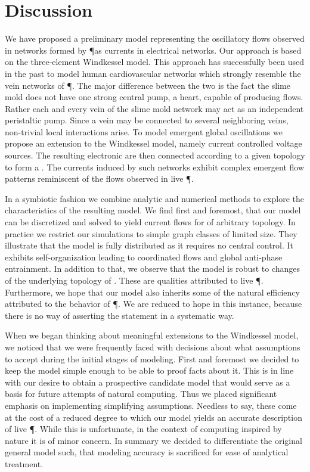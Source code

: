 \section{Discussion}

	We have proposed a preliminary model representing the oscillatory flows observed in networks formed by \P as currents in electrical networks. Our approach is based on the three-element Windkessel model. This approach has successfully been used in the past to model human cardiovascular networks which strongly resemble the vein networks of \P. The major difference between the two is the fact the slime mold does not have one strong central pump, \ie a heart, capable of producing flows. Rather each and every vein of the slime mold network may act as an independent peristaltic pump. Since a vein may be connected to several neighboring veins, non-trivial local interactions arise. To model emergent global oscillations we propose an extension to the Windkessel model, namely current controlled voltage sources. The resulting electronic \Pes are then connected according to a given topology to form a \Pn. The currents induced by such networks exhibit complex emergent flow patterns reminiscent of the flows observed in live \P.

	In a symbiotic fashion we combine analytic and numerical methods to explore the characteristics of the resulting model. We find first and foremost, that our model can be discretized and solved to yield current flows for \Pn of arbitrary topology. In practice we restrict our simulations to simple graph classes of limited size. They illustrate that the model is fully distributed as it requires no central control. It exhibits self-organization leading to coordinated flows and global anti-phase entrainment. In addition to that, we observe that the model is robust to changes of the underlying topology of \Pns. These are qualities attributed to live \P. Furthermore, we hope that our model also inherits some of the natural efficiency attributed to the behavior of \P. We are reduced to hope in this instance, because there is no way of asserting the statement in a systematic way.

	When we began thinking about meaningful extensions to the Windkessel model, we noticed that we were frequently faced with decisions about what assumptions to accept during the initial stages of modeling. First and foremost we decided to keep the model simple enough to be able to proof facts about it. This is in line with our desire to obtain a prospective candidate model that would serve as a basis for future attempts of natural computing. Thus we placed significant emphasis on implementing simplifying assumptions. Needless to say, these come at the cost of a reduced degree to which our model yields an accurate description of live \P. While this is unfortunate, in the context of computing inspired by nature it is of minor concern. In summary we decided to differentiate the original general model such, that modeling accuracy is sacrificed for ease of analytical treatment.

